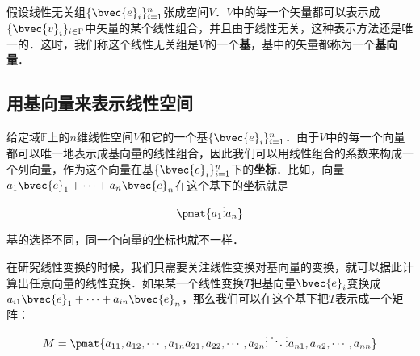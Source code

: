 假设线性无关组$\{\bvec{e}_i\}_{i=1}^{n}$张成空间$V$．$V$中的每一个矢量都可以表示成$\{\bvec{v}_i\}_{i\in\Gamma}$中矢量的某个线性组合，并且由于线性无关，这种表示方法还是唯一的．这时，我们称这个线性无关组是$V$的一个\textbf{基}，基中的矢量都称为一个\textbf{基向量}．

\subsection{用基向量来表示线性空间}

给定域$\mathbb{F}$上的$n$维线性空间$V$和它的一个基$\{\bvec{e}_i\}_{i=1}^{n}$．由于$V$中的每一个向量都可以唯一地表示成基向量的线性组合，因此我们可以用线性组合的系数来构成一个列向量，作为这个向量在基$\{\bvec{e}_i\}_{i=1}^{n}$下的\textbf{坐标}．比如，向量$a_1\bvec{e}_1+\cdots+a_n\bvec{e}_n$在这个基下的坐标就是$$\pmat{a_1\newline\vdots\newline a_n}$$

基的选择不同，同一个向量的坐标也就不一样．

在研究线性变换的时候，我们只需要关注线性变换对基向量的变换，就可以据此计算出任意向量的线性变换．如果某一个线性变换$T$把基向量$\bvec{e}_i$变换成$a_{i1}\bvec{e}_1+\cdots+a_{in}\bvec{e}_n$，那么我们可以在这个基下把$T$表示成一个矩阵：$$M=\pmat{a_{11},a_{12},\cdots,a_{1n}\newline a_{21},a_{22},\cdots,a_{2n}\newline\vdots\ddots\vdots\newline a_{n1},a_{n2},\cdots,a_{nn}}$$